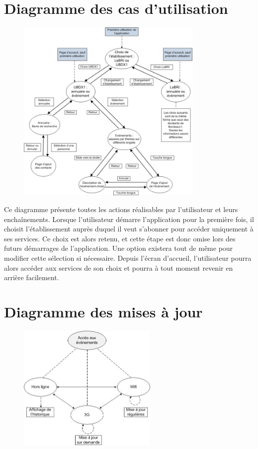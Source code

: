 \documentclass [pdftex,12pt] {report}
\begin{document}
\section{Diagramme des cas d'utilisation}

\begin{figure}[h]
  \center
  \includegraphics[width=0.8\textwidth]{resources/useCases.jpg}
\end{figure}

\newpage
Ce diagramme présente toutes les actions réalisables par l'utilisateur et leurs enchaînements.
Lorsque l'utilisateur démarre l'application pour la première fois, il choisit l'établissement auprès duquel il veut s'abonner pour accéder uniquement à ses services. Ce choix est alors retenu, et cette étape est donc omise lors des futurs démarrages de l'application. Une option existera tout de même pour modifier cette sélection si nécessaire. Depuis l'écran d'accueil, l'utilisateur pourra alors accéder aux services de son choix et pourra à tout moment revenir en arrière facilement.

\section{Diagramme des mises à jour}

\begin{figure}[h]
  \center
  \includegraphics[width=0.6\textwidth]{resources/state_diagram.jpg}
\end{figure}
\end{document}
